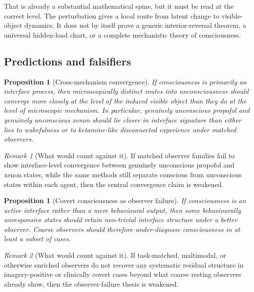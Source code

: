 \documentclass[11pt,a4paper]{article}
\numberwithin{equation}{section}
\theoremstyle{thmcompact}
\newtheorem{proposition}[theorem]{Proposition}
\theoremstyle{remark}
\newtheorem*{remarkplain}{Remark}
\newenvironment{remark}[1][]%
{\begin{remarkbox}\begin{remarkplain}[#1]\normalfont}
{\end{remarkplain}\end{remarkbox}}
\begin{document}
That is already a substantial mathematical spine, but it must be read at the correct level. The perturbation gives a local route from latent change to visible-object dynamics. It does not by itself prove a generic interior-reversal theorem, a universal hidden-load chart, or a complete mechanistic theory of consciousness.

\subsection{Predictions and falsifiers}

\begin{proposition}[Cross-mechanism convergence]
\label{prop:cross-mechanism}
If consciousness is primarily an interface process, then microscopically distinct routes into unconsciousness should converge more closely at the level of the induced visible object than they do at the level of microscopic mechanism. In particular, genuinely unconscious propofol and genuinely unconscious xenon should lie closer in interface signature than either lies to wakefulness or to ketamine-like disconnected experience under matched observers.
\end{proposition}

\begin{remark}[What would count against it]
If matched observer families fail to show interface-level convergence between genuinely unconscious propofol and xenon states, while the same methods still separate conscious from unconscious states within each agent, then the central convergence claim is weakened.
\end{remark}

\begin{proposition}[Covert consciousness as observer failure]
\label{prop:covert}
If consciousness is an active interface rather than a mere behavioural output, then some behaviourally unresponsive states should retain non-trivial interface structure under a better observer. Coarse observers should therefore under-diagnose consciousness in at least a subset of cases.
\end{proposition}

\begin{remark}[What would count against it]
If task-matched, multimodal, or otherwise enriched observers do not recover any systematic residual structure in imagery-positive or clinically covert cases beyond what coarse resting observers already show, then the observer-failure thesis is weakened.
\end{remark}
\end{document}
